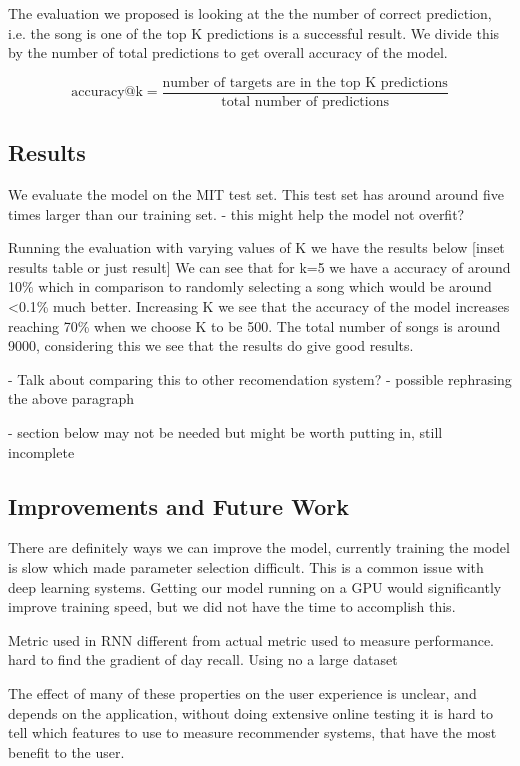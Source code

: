 \documentclass{article} %
\begin{document}
The evaluation we proposed is looking at the the number of correct prediction, i.e. the song is one of the top K predictions is a successful result. We divide this by the number of total predictions to get overall accuracy of the model.

\begin{equation}
\text{accuracy@k} = \frac{\text{number of targets are in the top K predictions}}{\text{total number of predictions}}
\end{equation}
\subsection{Results}

We evaluate the model on the MIT test set. This test set has around around five times larger than our training set. - this might help the model not overfit?

Running the evaluation with varying values of K we have the results below 
[inset results table or just result] 
We can see that for k=5 we have a accuracy of around 10\% which in comparison to randomly selecting a song which would be around <0.1\% much better. Increasing K we see that the accuracy of the model increases reaching 70\% when we choose K to be 500. The total number of songs is around 9000, considering this we see that the results do give good results. 

 - Talk about comparing this to other recomendation system?
 - possible rephrasing the above paragraph


- section below may not be needed but might be worth putting in, still incomplete

\subsection{Improvements and Future Work}
There are definitely ways we can improve the model, currently training the model is slow which made parameter selection difficult. This is a common issue with deep learning systems. Getting our model running on a GPU would significantly improve training speed, but we did not have the time to accomplish this. 

Metric used in RNN different from actual metric used to measure performance.
	hard to find the gradient of day recall.
Using no a large dataset

The effect of many of these properties on the user experience is unclear, and depends on the application, without doing extensive online testing it is hard to tell which features to use to measure recommender systems, that have the most benefit to the user.
\end{document}
